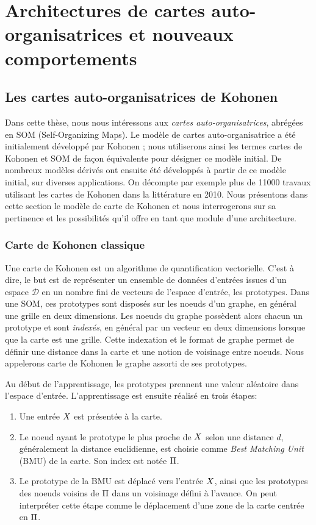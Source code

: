 \documentclass[../main]{subfiles}
\begin{document}
\graphicspath{{./figures}}
\chapter{Architectures de cartes auto-organisatrices et nouveaux comportements}
\minitoc



\section{Les cartes auto-organisatrices de Kohonen}\label{sec:som001}

Dans cette thèse, nous nous intéressons aux \emph{cartes auto-organisatrices}, abrégées en SOM (Self-Organizing Maps).
Le modèle de cartes auto-organisatrice a été initialement développé par Kohonen \cite{Kohonen1982}; nous utiliserons ainsi les termes cartes de Kohonen et SOM de façon équivalente pour désigner ce modèle initial.
De nombreux modèles dérivés ont ensuite été développés à partir de ce modèle initial, sur diverses applications.
On décompte par exemple plus de 11000 travaux utilisant les cartes de Kohonen dans la littérature en 2010.
Nous présentons dans cette section le modèle de carte de Kohonen et nous interrogerons sur sa pertinence et les possibilités qu'il offre en tant que module d'une architecture. 

\subsection{Carte de Kohonen classique}

Une carte de Kohonen est un algorithme de quantification vectorielle. C'est à dire, le but est de représenter un ensemble de données d'entrées issues d'un espace $\mathcal{D}$ en un nombre fini de vecteurs de l'espace d'entrée, les prototypes. Dans une SOM, ces prototypes sont disposés sur les noeuds d'un graphe, en général une grille en deux dimensions.
Les noeuds du graphe possèdent alors chacun un prototype et sont \emph{indexés}, en général par un vecteur en deux dimensions lorsque que la carte est une grille.
Cette indexation et le format de graphe permet de définir une distance dans la carte et une notion de voisinage entre noeuds.
Nous appelerons carte de Kohonen le graphe assorti de ses prototypes.

Au début de l'apprentissage, les prototypes prennent une valeur aléatoire dans l'espace d'entrée. 
L'apprentissage est ensuite réalisé en trois étapes:
\begin{enumerate}
\item Une entrée $X$ est présentée à la carte.
\item Le noeud ayant le prototype le plus proche de $X$ selon une distance $d$, généralement la distance euclidienne, est choisie comme \emph{Best Matching Unit} (BMU) de la carte. Son index est notée $\Pi$.
\item Le prototype de la BMU est déplacé vers l'entrée $X$, ainsi que les prototypes des noeuds voisins de $\Pi$ dans un voisinage défini à l'avance. On peut interpréter cette étape comme le déplacement d'une zone de la carte centrée en $\Pi$.
\end{enumerate}
\end{document}
